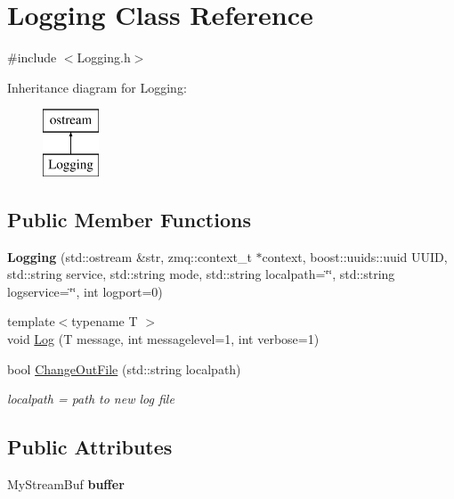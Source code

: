 \hypertarget{classLogging}{\section{Logging Class Reference}
\label{classLogging}
}


{\ttfamily \#include $<$Logging.\-h$>$}

Inheritance diagram for Logging\-:\begin{figure}[H]
\begin{center}
\leavevmode
\includegraphics[height=2.000000cm]{classLogging}
\end{center}
\end{figure}
\subsection*{Public Member Functions}
\begin{DoxyCompactItemize}
\item 
\hypertarget{classLogging_ae7cc7299c697019f273b75cbfefff848}{{\bfseries Logging} (std\-::ostream \&str, zmq\-::context\-\_\-t $\ast$context, boost\-::uuids\-::uuid U\-U\-I\-D, std\-::string service, std\-::string mode, std\-::string localpath=\char`\"{}\char`\"{}, std\-::string logservice=\char`\"{}\char`\"{}, int logport=0)}\label{classLogging_ae7cc7299c697019f273b75cbfefff848}

\item 
{\footnotesize template$<$typename T $>$ }\\void \hyperlink{classLogging_af7839ee68729b066da269cc012b1fcc9}{Log} (T message, int messagelevel=1, int verbose=1)
\item 
bool \hyperlink{classLogging_a7a0c89c152ad81fb41a849ed9d81e429}{Change\-Out\-File} (std\-::string localpath)
\begin{DoxyCompactList}\small\item\em localpath = path to new log file \end{DoxyCompactList}\end{DoxyCompactItemize}
\subsection*{Public Attributes}
\begin{DoxyCompactItemize}
\item 
\hypertarget{classLogging_a9622376d4c126c163334149cabc98bcc}{My\-Stream\-Buf {\bfseries buffer}}\label{classLogging_a9622376d4c126c163334149cabc98bcc}

\end{DoxyCompactItemize}



